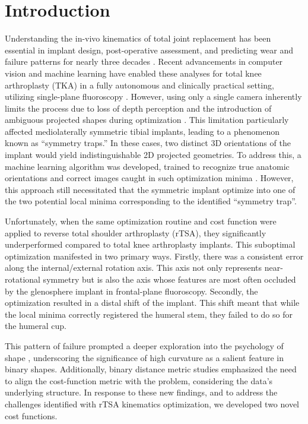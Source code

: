 \section{Introduction}
Understanding the in-vivo kinematics of total joint replacement has been essential in implant design, post-operative assessment, and predicting wear and failure patterns for nearly three decades \cite{freglyComputationalWearPrediction2005,banks2003HapPaul2004,banksRationaleResultsFixedBearing2019}.
Recent advancements in computer vision and machine learning have enabled these analyses for total knee arthroplasty (TKA) in a fully autonomous and clinically practical setting, utilizing single-plane fluoroscopy \cite{brobergValidationMachineLearning2023,jensenJointTrackMachine2023}.
However, using only a single camera inherently limits the process due to loss of depth perception and the introduction of ambiguous projected shapes during optimization \cite{floodAutomatedRegistration3D2018,mahfouzRobustMethodRegistration2003,zuffiModelbasedMethodReconstruction1999,banksAccurateMeasurementThreedimensional1996}.
This limitation particularly affected mediolaterally symmetric tibial implants, leading to a phenomenon known as “symmetry traps.”
In these cases, two distinct 3D orientations of the implant would yield indistinguishable 2D projected geometries.
To address this, a machine learning algorithm was developed, trained to recognize true anatomic orientations and correct images caught in such optimization minima \cite{jensenCorrectingSymmetricImplantInReview}.
However, this approach still necessitated that the symmetric implant optimize into one of the two potential local minima corresponding to the identified “symmetry trap”.

Unfortunately, when the same optimization routine and cost function \cite{floodAutomatedRegistration3D2018,jensenJointTrackMachine2023} were applied to reverse total shoulder arthroplasty (rTSA), they significantly underperformed compared to total knee arthroplasty implants.
This suboptimal optimization manifested in two primary ways.
Firstly, there was a consistent error along the internal/external rotation axis.
This axis not only represents near-rotational symmetry but is also the axis whose features are most often occluded by the glenosphere implant in frontal-plane fluoroscopy.
Secondly, the optimization resulted in a distal shift of the implant.
This shift meant that while the local minima correctly registered the humeral stem, they failed to do so for the humeral cup.

This pattern of failure prompted a deeper exploration into the psychology of shape \cite{attneaveInformationalAspectsVisual1954,attneaveQuantitativeStudyShape1956}, underscoring the significance of high curvature as a salient feature in binary shapes.
Additionally, binary distance metric studies \cite{reinkeCommonLimitationsImage2023,reinkeUnderstandingMetricrelatedPitfalls2023}emphasized the need to align the cost-function metric with the problem, considering the data's underlying structure.
In response to these new findings, and to address the challenges identified with rTSA kinematics optimization, we developed two novel cost functions.


